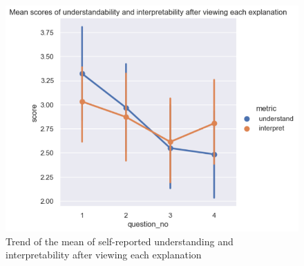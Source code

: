 \begin{figure}[!ht]
  \centering
  \includegraphics[width=1\linewidth]{figures/part3.png}
  \caption{Trend of the mean of self-reported understanding and interpretability after viewing each explanation}
  \label{fig:part3_trend}
\end{figure}


